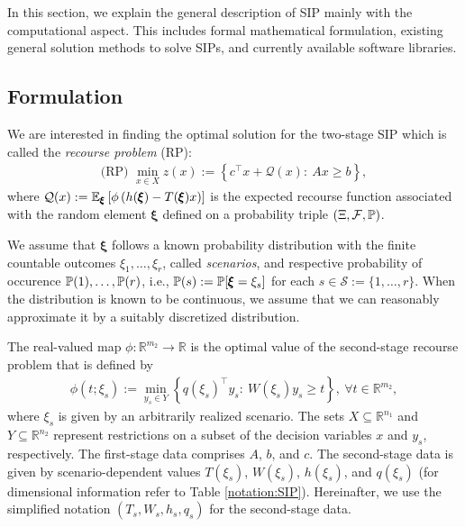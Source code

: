 In this section, we explain the general description of SIP mainly with the computational aspect. This includes formal mathematical formulation, existing general solution methods to solve SIPs, and currently available software libraries.
\subsection{Formulation}

We are interested in finding the optimal solution for the two-stage SIP which is called the \textit{recourse problem} (RP): 
\begin{align}
\textrm{(RP) }\min_{x\in X} z(x):={\left\{c^\top x + \mathcal{Q}(x):\ Ax\ge b\right\}}, \label{eq:SIP_1}
\end{align}
where $\mathcal{Q}(x):=\operatorname*{\mathbb{E}}_{\pmb{\xi}}\left[ \phi\left( h(\pmb{\xi})-T(\pmb{\xi})x \right) \right]$ is the expected recourse function associated with the random element $\pmb{\xi}$ defined on a probability triple $(\Xi, \mathcal{F},\operatorname*{\mathbb{P}})$.

We assume that $\pmb{\xi}$ follows a known probability distribution with the finite countable outcomes $\xi_1,\ldots,\xi_r$, called \textit{scenarios},  and respective probability of occurence $\operatorname*{\mathbb{P}}(1),\ldots,\operatorname*{\mathbb{P}}(r)$, i.e., $\operatorname*{\mathbb{P}}(s):=\operatorname*{\mathbb{P}}[\pmb{\xi}=\xi_s]$ for each $s\in\mathcal{S}:=\{1,\ldots,r\}$. When the distribution is known to be continuous, we assume that we can reasonably approximate it by a suitably discretized distribution. 

The real-valued map $\phi:\mathbb{R}^{m_2}\to\mathbb{R}$ is the optimal value of the second-stage recourse problem that is defined by
\begin{align}
\phi(t;{\xi_s}):=\min_{y_s\in Y}\left\{ q(\xi_s)^\top y_s:\ W(\xi_s)y_s \ge t \right\},\ \forall t\in\mathbb{R}^{m_2},
\end{align}
where $\xi_s$ is given by an arbitrarily realized scenario.
The sets $X\subseteq \mathbb{R}^{n_1}$ and $Y\subseteq\mathbb{R}^{n_2}$ represent restrictions on a subset of the decision variables $x$ and $y_s$, respectively. 
The first-stage data comprises $A$, $b$, and $c$. The second-stage data is given by scenario-dependent values $T(\xi_s)$, $W(\xi_s)$, $h(\xi_s)$, and $q(\xi_s)$ (for dimensional information refer to Table \ref{notation:SIP}). Hereinafter, we use the simplified notation $(T_s,W_s,h_s,q_s)$ for the second-stage data. 

